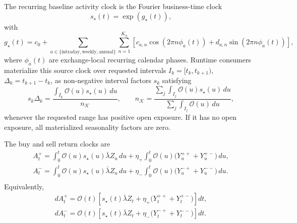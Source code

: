 \documentclass[11pt]{article}
\begin{document}
    The recurring baseline activity clock is the Fourier business-time clock
    \[
        s_\star(t)=\exp(g_\star(t)),
    \]
    with
    \[
        g_\star(t)
        =
        c_0
        +
        \sum_{a\in\{\mathrm{intraday},\mathrm{weekly},\mathrm{annual}\}}
        \sum_{n=1}^{K_a}
        \left[
            c_{a,n}\cos(2\pi n\phi_a(t))
            +
            d_{a,n}\sin(2\pi n\phi_a(t))
        \right],
    \]
    where \(\phi_a(t)\) are exchange-local recurring calendar phases.
    Runtime consumers materialize this source clock over requested intervals
    \(I_k=[t_k,t_{k+1})\), \(\Delta_k=t_{k+1}-t_k\), as non-negative interval
    factors \(s_k\) satisfying
    \[
        s_k\Delta_k
        =
        \frac{
            \int_{I_k}\mathcal O(u)s_\star(u)\,du
        }{
            n_{\mathcal K}
        },
        \qquad
        n_{\mathcal K}
        =
        \frac{
            \sum_j\int_{I_j}\mathcal O(u)s_\star(u)\,du
        }{
            \sum_j\int_{I_j}\mathcal O(u)\,du
        },
    \]
    whenever the requested range has positive open exposure.
    If it has no open exposure, all materialized seasonality factors
    are zero.

    The buy and sell return clocks are
    \begin{gather*}
        A_t^+
        =
        \int_0^t \mathcal O(u)s_\star(u)\bar\lambda Z_u\,du
        +
        \eta_+\int_0^t \mathcal O(u)
        \big(Y_u^{++}+Y_u^{+-}\big)\,du,\\
        A_t^-
        =
        \int_0^t \mathcal O(u)s_\star(u)\bar\lambda Z_u\,du
        +
        \eta_-\int_0^t \mathcal O(u)
        \big(Y_u^{-+}+Y_u^{--}\big)\,du.\\
    \end{gather*}
    Equivalently,
    \begin{gather*}
        dA_t^+
        =
        \mathcal O(t)
        \left[
            s_\star(t)\bar\lambda Z_t
            +
            \eta_+\big(Y_t^{++}+Y_t^{+-}\big)
        \right]dt,\\
        dA_t^-
        =
        \mathcal O(t)
        \left[
            s_\star(t)\bar\lambda Z_t
            +
            \eta_-\big(Y_t^{-+}+Y_t^{--}\big)
        \right]dt.\\
    \end{gather*}
\end{document}
